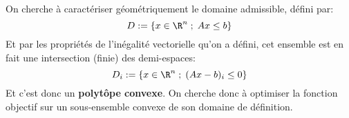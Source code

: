 \subsection*{}
On cherche à caractériser géométriquement le domaine admissible, défini par:
\[ 
   D := \left\{ x \in \R^n \; ; \; Ax \leq b \right\}  
\]
Et par les propriétés de l'inégalité vectorielle qu'on a défini, cet ensemble est en fait une intersection (finie) des demi-espaces:
\[ 
   D_i := \left\{ x \in \R^n \; ; \; (Ax - b)_i \leq 0 \right\} 
\]
Et c'est donc un \textbf{polytôpe convexe}. On cherche donc à optimiser la fonction objectif sur un sous-ensemble convexe de son domaine de définition.
\subsection*{}
